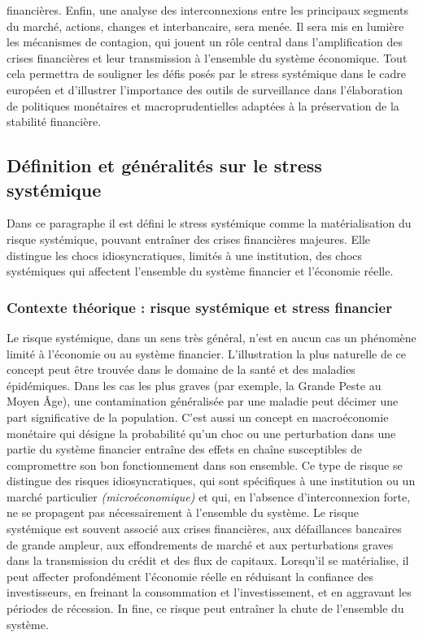 financières. Enfin, une analyse des interconnexions entre les principaux segments du marché, actions, changes et interbancaire, sera menée. Il sera mis en lumière les mécanismes de contagion, qui jouent un rôle central dans l’amplification des crises financières et leur transmission à l’ensemble du système économique. Tout cela permettra de souligner les défis posés par le stress systémique dans le cadre européen et d’illustrer l’importance des outils de surveillance dans l’élaboration de politiques monétaires et macroprudentielles adaptées à la préservation de la stabilité financière.

\subsection{Définition et généralités sur le stress systémique}

Dans ce paragraphe il est défini le stress systémique comme la matérialisation du risque systémique, pouvant entraîner des crises financières majeures. Elle distingue les chocs idiosyncratiques, limités à une institution, des chocs systémiques qui affectent l’ensemble du système financier et l’économie réelle.

\subsubsection{Contexte théorique : risque systémique et stress financier}

Le risque systémique, dans un sens très général, n’est en aucun cas un phénomène limité à l’économie ou au système financier. L’illustration la plus naturelle de ce concept peut être trouvée dans le domaine de la santé et des maladies épidémiques. Dans les cas les plus graves (par exemple, la Grande Peste au Moyen Âge), une contamination généralisée par une maladie peut décimer une part significative de la population. C'est aussi un concept en macroéconomie monétaire qui désigne la probabilité qu’un choc ou une perturbation dans une partie du système financier entraîne des effets en chaîne susceptibles de compromettre son bon fonctionnement dans son ensemble. Ce type de risque se distingue des risques idiosyncratiques, qui sont spécifiques à une institution ou un marché particulier \textit{(microéconomique)} et qui, en l’absence d’interconnexion forte, ne se propagent pas nécessairement à l’ensemble du système. Le risque systémique est souvent associé aux crises financières, aux défaillances bancaires de grande ampleur, aux effondrements de marché et aux perturbations graves dans la transmission du crédit et des flux de capitaux. Lorsqu’il se matérialise, il peut affecter profondément l’économie réelle en réduisant la confiance des investisseurs, en freinant la consommation et l’investissement, et en aggravant les périodes de récession. In fine, ce risque peut entraîner la chute de l'ensemble du système. \\

